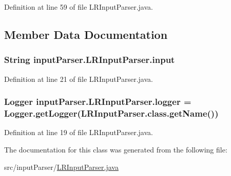 Definition at line 59 of file L\-R\-Input\-Parser.\-java.



\subsection{Member Data Documentation}
\hypertarget{classinput_parser_1_1_l_r_input_parser_a7f407afa631516efdbaf3cee992bb16f}{
\subsubsection[{input}]{\setlength{\rightskip}{0pt plus 5cm}String {\bf input\-Parser.\-L\-R\-Input\-Parser.\-input}}}\label{classinput_parser_1_1_l_r_input_parser_a7f407afa631516efdbaf3cee992bb16f}


Definition at line 21 of file L\-R\-Input\-Parser.\-java.

\hypertarget{classinput_parser_1_1_l_r_input_parser_ae3d6e07ebb7d4368f1a2e2ad05dae6f7}{
\subsubsection[{logger}]{\setlength{\rightskip}{0pt plus 5cm}Logger {\bf input\-Parser.\-L\-R\-Input\-Parser.\-logger} = Logger.\-get\-Logger(L\-R\-Input\-Parser.\-class.\-get\-Name())}}\label{classinput_parser_1_1_l_r_input_parser_ae3d6e07ebb7d4368f1a2e2ad05dae6f7}


Definition at line 19 of file L\-R\-Input\-Parser.\-java.



The documentation for this class was generated from the following file\-:\begin{DoxyCompactItemize}
\item 
src/input\-Parser/\hyperlink{_l_r_input_parser_8java}{L\-R\-Input\-Parser.\-java}\end{DoxyCompactItemize}

